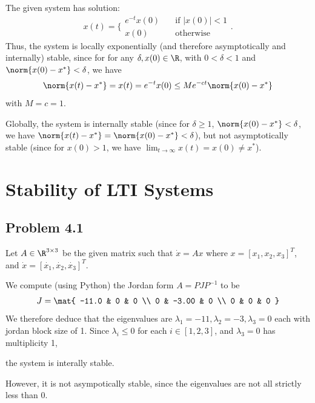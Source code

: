 \documentclass{homework}
\begin{document}
\begin{letterenum}
    \item The given system has solution:
    \begin{equation}
        x(t) = \biggl\{\begin{array}{ll}
            e^{-t}x(0) &\quad \text{if } |x(0)| < 1 \\
            x(0) &\quad \text{otherwise}
        \end{array}
    \biggr.
    \end{equation}
    Thus, the system is locally exponentially (and therefore asymptotically
    and internally)
    stable, since for for any $\delta, x(0)\in\R$, with
    $0 < \delta < 1$ and $\norm{x(0) - x^*} < \delta$,
    we have \begin{equation}
        \norm{x(t) - x^*} = x(t) = e^{-t}x(0) \leq Me^{-ct} \norm{x(0) - x^*}
    \end{equation}
    with $M = c = 1$.

    Globally, the system is internally stable (since for $\delta \geq 1$,
    $\norm{x(0) - x^*} < \delta$, we have
    $\norm{x(t) - x^*} = \norm{x(0) - x^*} < \delta$),
    but not asymptotically stable (since for $x(0) > 1$,
    we have $\lim_{t\to\infty} x(t) = x(0) \neq x^*$).
\end{letterenum}

\section{Stability of LTI Systems}

\subsection{Problem 4.1}

Let $A \in \R^{3\times 3}$ be the given matrix such that $\dot{x} = Ax$
where $x = [x_1, x_2, x_3]^T$, and $\dot{x} = [\dot{x_1}, \dot{x_2}, \dot{x_3}]^T$.

We compute (using Python) the Jordan form $A = PJP^{-1}$ to be
\begin{equation}
    J = \mat{
        -11.0 & 0 & 0  \\
        0 & -3.00 & 0  \\
        0 & 0 & 0
    }
\end{equation}
We therefore deduce that the eigenvalues are
$\lambda_1 = -11, \lambda_2 = -3, \lambda_3 = 0$ each with jordan block size of 1.
Since $\lambda_i \leq 0$ for each $i\in[1,2,3]$, and $\lambda_3=0$ has multiplicity
1,
\begin{letterenum}
    \item the system is interally stable.
    \item However, it is not asympotically stable, since the eigenvalues are not all
    strictly less than 0.
\end{letterenum}
\end{document}
